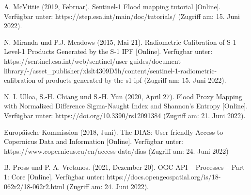 \begin{thebibliography}{1}
A. McVittie (2019, Februar). Sentinel-1 Flood mapping tutorial [Online]. Verfügbar unter: 
https://step.esa.int/main/doc/tutorials/
(Zugriff am: 15. Juni 2022).

N. Miranda und P.J. Meadows (2015, Mai 21). Radiometric Calibration of S-1 Level-1 Products Generated by the S-1 IPF [Online]. Verfügbar unter: 
https://sentinel.esa.int/web/sentinel/user-guides/document-library/-/asset\_publisher/xlslt4309D5h/content/sentinel-1-radiometric-calibration-of-products-generated-by-the-s1-ipf
(Zugriff am: 15. Juni 2022).

N. I. Ulloa, S.-H. Chiang und S.-H. Yun (2020, April 27). Flood Proxy Mapping with Normalized Difference Sigma-Naught Index and Shannon’s Entropy [Online]. Verfügbar unter: 
https://doi.org/10.3390/rs12091384 
(Zugriff am: 21. Juni 2022).

Europäische Kommission (2018, Juni). The DIAS: User-friendly Access to Copernicus Data and Information [Online]. Verfügbar unter:
https://www.copernicus.eu/en/access-data/dias
(Zugriff am: 24. Juni 2022)

B. Pross und P. A. Vretanos. (2021, Dezember 20). OGC API – Processes – Part 1: Core [Online]. Verfügbar unter: 
https://docs.opengeospatial.org/is/18-062r2/18-062r2.html 
(Zugriff am: 24. Juni 2022).

\end{thebibliography}